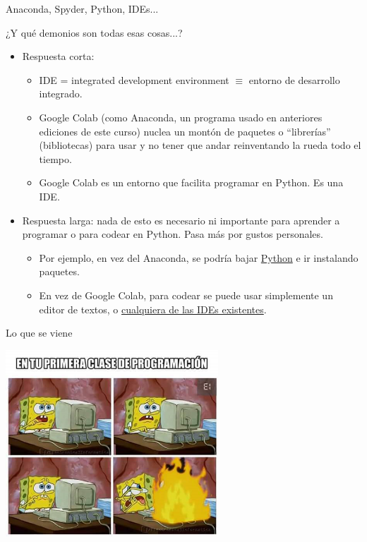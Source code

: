\documentclass{beamer}
\begin{document}
\begin{frame}{Anaconda, Spyder, Python, IDEs...}
\begin{block}{¿Y qué demonios son todas esas cosas...?}\pause
\begin{itemize}
	\item Respuesta corta:\pause
		\begin{itemize}
			\item IDE = integrated development environment $\equiv$ entorno de desarrollo integrado.\pause
			\item Google Colab (como Anaconda, un programa usado en anteriores ediciones de este curso) nuclea un montón de paquetes o ``librerías'' (bibliotecas) para usar y no tener que andar reinventando la rueda todo el tiempo.\pause
			\item Google Colab es un entorno que facilita programar en Python. Es una IDE.\pause


		\end{itemize}
	\item Respuesta larga: nada de esto es necesario ni importante para aprender a programar o para codear en Python. Pasa más por gustos personales.\pause
	\begin{itemize}
		\item Por ejemplo, en vez del Anaconda, se podría bajar \textcolor{blue}{\href{https://www.python.org/}{Python}} e ir instalando paquetes.\pause		
		\item En vez de Google Colab, para codear se puede usar simplemente un editor de textos, o \textcolor{blue}{\href{https://wiki.python.org/moin/IntegratedDevelopmentEnvironments}{cualquiera de las IDEs existentes}}.
	\end{itemize}
\end{itemize}
\end{block}
\end{frame}

\begin{frame}{Lo que se viene}
\pause
\begin{center}
\includegraphics[height=7cm, scale=0.5]{meme_explosion.png}
\end{center}
\end{frame}
\end{document}
